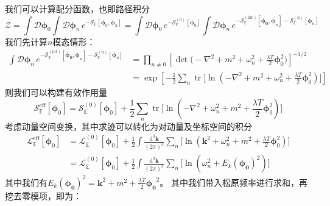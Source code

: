 我们可以计算配分函数，也即路径积分
\begin{equation}
    \mathcal{Z}=\int\mathcal{D}\boldsymbol{\phi}_0\int \mathcal{D}\boldsymbol{\phi}_n \, e^{-\mathcal{S}_\mathbb{E}[\boldsymbol{\phi}_0,\boldsymbol{\phi}_n]} = \int\mathcal{D}\boldsymbol{\phi}_0\, e^{-\mathcal{S}^{(0)}_\mathbb{E}[\boldsymbol{\phi}_0]}\int\mathcal{D}\boldsymbol{\phi}_n \, e^{-\mathcal{S}^{(\mathrm{int})}_\mathbb{E}[\boldsymbol{\boldsymbol{\phi}_0,\phi}_n]-\mathcal{S}^{(n)}_\mathbb{E}[\boldsymbol{\phi}_n]}
\end{equation}
我们先计算$n$模态情形：
\begin{equation}
\begin{split}
        \int\mathcal{D}\boldsymbol{\phi}_n \, e^{-\mathcal{S}^{(\mathrm{int})}_\mathbb{E}[\boldsymbol{\boldsymbol{\phi}_0,\phi}_n]-\mathcal{S}^{(n)}_\mathbb{E}[\boldsymbol{\phi}_n]} &= \prod_{n\neq0} \left[ \operatorname{det}\Big(-\nabla^2 + m^2+\omega_n^2 + \frac{\lambda T}{2} \boldsymbol{\phi}_0^2\Big) \right]^{-1/2}\\&=\exp\left[ -\frac{1}{2}\sum_{n}\operatorname{tr}\Big[ \ln(-\nabla^2+m^2+\omega_n^2+\frac{\lambda T}{2}\boldsymbol{\phi}_0^2) \Big] \right]
\end{split}
\end{equation}
则我们可以构建有效作用量
\begin{equation}
     {\mathcal{S}^\mathrm{eff}_\mathbb{E}}[\boldsymbol{\phi}_0] = {\mathcal{S}^{(0)}_\mathbb{E}}[\boldsymbol{\phi}_0] +\frac{1}{2}\sum_{n}\operatorname{tr}\Big[ \ln(-\nabla^2+\omega_n^2+m^2+\frac{\lambda T}{2}\boldsymbol{\phi}_0^2) \Big] 
\end{equation}
考虑动量空间变换，其中求迹可以转化为对动量及坐标空间的积分
\begin{equation}
\begin{split}
 {\mathcal{L}^\mathrm{eff}_\mathbb{E}}[\boldsymbol{\phi}_0] &= {\mathcal{L}^{(0)}_\mathbb{E}}[\boldsymbol{\phi}_0] +\frac{1}{2}\int\frac{\mathrm{d}^3\boldsymbol{k}}{(2\pi)^3} \sum_{n}\Big[ \ln(\boldsymbol{k}^2+\omega_n^2+m^2+\frac{\lambda T}{2}\boldsymbol{\phi}_0^2) \Big] \\
 &=   {\mathcal{L}^{(0)}_\mathbb{E}}[\boldsymbol{\phi}_0] +\frac{1}{2}\int\frac{\mathrm{d}^3\boldsymbol{k}}{(2\pi)^3}\sum_{n}\Big[ \ln(\omega_n^2+E_k(\boldsymbol{\phi_0})^2) \Big]
\end{split}
\end{equation}
其中我们有$E_k(\boldsymbol{\phi_0})^2 = \boldsymbol{k}^2 +m^2 + \frac{\lambda T}{2}\boldsymbol{\phi_0}^2 $。
其中我们带入松原频率进行求和，再挖去零模项，即为：
